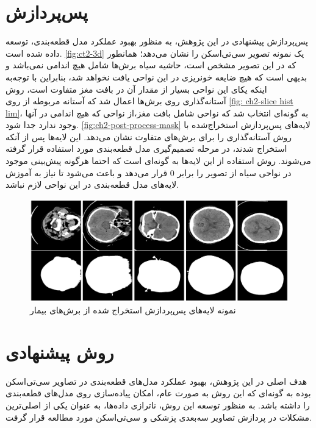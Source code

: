 \section{پس‌پردازش}
\label{ch2-post-process}
پس‌پردازش پیشنهادی در این پژوهش، به منظور بهبود عملکرد مدل قطعه‌بندی، توسعه داده شده است.
\autoref{fig:ct2-3d}
یک نمونه تصویر سی‌تی‌اسکن را نشان می‌دهد؛ همانطور که در این تصویر مشخص است،‌ حاشیه سیاه برش‌ها شامل هیچ اندامی نمی‌باشد و بدیهی است که هیچ ضایعه خونریزی در این نواحی یافت نخواهد شد، بنابراین با توجه‌به اینکه یکای 
 این نواحی بسیار از مقدار آن در بافت مغز متفاوت است، روش آستانه‌گذاری روی برش‌ها اعمال شد که آستانه مربوطه از روی 
\autoref{fig: ch2-slice hist lim}،
به گونه‌ای انتخاب شد که نواحی شامل بافت مغز،‌از نواحی که هیچ اندامی در آنها وجود ندارد جدا شود.
\autoref{fig:ch2-post-process-mask}
لایه‌های پس‌پردازش استخراج‌شده با روش آستانه‌گذاری را برای برش‌های متفاوت نشان می‌دهد. این لایه‌ها پس از آنکه استخراج شدند،‌ در مرحله تصمیم‌گیری مدل قطعه‌بندی مورد استفاده قرار گرفته می‌شوند. روش استفاده از این لایه‌ها به گونه‌ای است که احتما هرگونه پیش‌بینی موجود در نواحی سیاه از تصویر را برابر 0 قرار می‌دهد و باعث می‌شود تا نیاز به آموزش لایه‌های مدل قطعه‌بندی  در این نواحی لازم نباشد.




\begin{figure}[h]
\centering
\includegraphics[width=1.0\linewidth]{"Images/Chapter2/post-process mask"}
\caption{نمونه لایه‌های پس‌پردازش استخراج شده از برش‌های بیمار}
\label{fig:ch2-post-process-mask}
\end{figure}




\section{روش پیشنهادی}
هدف اصلی در این پژوهش،‌ بهبود عملکرد مدل‌های قطعه‌بندی در تصاویر سی‌تی‌اسکن بوده به گونه‌ای که این روش به صورت عام، امکان پیاده‌سازی روی مدل‌های قطعه‌بندی را داشته باشد. به منظور توسعه این روش،‌ ناترازی داده‌ها،‌ به عنوان یکی از اصلی‌ترین مشکلات در پردازش تصاویر سه‌بعدی پزشکی و سی‌تی‌اسکن مورد مطالعه قرار گرفت.

